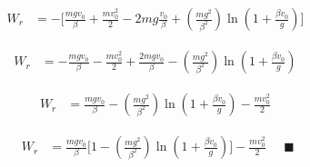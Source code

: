 \documentclass[a4paper,12pt]{article}
\begin{document}
\begin{flushleft}
\[
\begin{aligned}
W_r &= - \Bigg[ 
\frac{m g v_0 }{\beta}  + \frac{m v_0^2}{2}
- 2 mg\frac{v_0}{\beta} 
+ \left(\frac{m g^2}{\beta^2}\right)\ln \left( 1 + \frac{\beta v_0}{g} \right)
\Bigg]
\end{aligned}
\]

\[
\begin{aligned}
W_r &= 
- \frac{m g v_0 }{\beta} - \frac{m v_0^2}{2}
+ \frac{2 mg v_0}{\beta} 
- \left(\frac{m g^2}{\beta^2}\right)\ln \left( 1 + \frac{\beta v_0}{g} \right)
\end{aligned}
\]

\[
\begin{aligned}
W_r &= 
\frac{m g v_0 }{\beta}
- \left(\frac{m g^2}{\beta^2}\right)\ln \left( 1 + \frac{\beta v_0}{g} \right) - \frac{m v_0^2}{2}
\end{aligned}
\]

\[
\boxed{
\begin{aligned}
W_r &=  \frac{m g v_0 }{\beta} \Bigg[1 - \left(\frac{m g^2}{\beta^2}\right)\ln \left( 1 + \frac{\beta v_0}{g} \right) \Bigg] - \frac{m v_0^2}{2}
\end{aligned}
}
\quad \blacksquare
\]


\end{flushleft}
\end{document}
